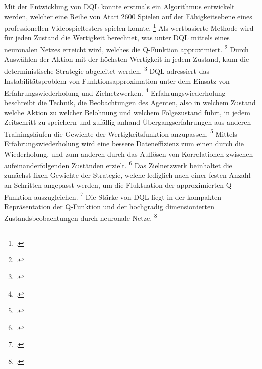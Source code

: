 Mit der Entwicklung von DQL konnte erstmals ein Algorithmus entwickelt werden, welcher eine Reihe von Atari 2600 Spielen auf der Fähigkeitsebene eines professionellen Videospieltesters spielen konnte. \footcite[Vgl.][S. 6]{Arulkumaran.2017}
Als wertbasierte Methode wird für jeden Zustand die Wertigkeit berechnet, was unter DQL mittels eines neuronalen Netzes erreicht wird, welches die Q-Funktion approximiert. \footcite[Vgl.][S. 4]{Huang.2017}
Durch Auswählen der Aktion mit der höchsten Wertigkeit in jedem Zustand, kann die deterministische Strategie abgeleitet werden. \footcite[Vgl.][S. 4]{Huang.2017}
DQL adressiert das Instabilitätsproblem von Funktionsapproximation unter dem Einsatz von Erfahrungswiederholung und Zielnetzwerken. \footcite[Vgl.][S. 7]{Arulkumaran.2017}
Erfahrungswiederholung beschreibt die Technik, die Beobachtungen des Agenten, also in welchem Zustand welche Aktion zu welcher Belohnung und welchem Folgezustand führt, in jedem Zeitschritt zu speichern und zufällig anhand Übergangserfahrungen aus anderen Trainingsläufen die Gewichte der Wertigkeitsfunktion anzupassen. \footcite[Vgl.][S. 4]{Mnih.2013}
Mittels Erfahrungswiederholung wird eine bessere Dateneffizienz zum einen durch die Wiederholung, und zum anderen durch das Auflösen von Korrelationen zwischen aufeinanderfolgenden Zuständen erzielt. \footcite[Vgl.][S. 4f.]{Mnih.2013}
Das Zielnetzwerk beinhaltet die zunächst fixen Gewichte der Strategie, welche lediglich nach einer festen Anzahl an Schritten angepasst werden, um die Fluktuation der approximierten Q-Funktion auszugleichen. \footcite[Vgl.][S. 7]{Arulkumaran.2017}
Die Stärke von DQL liegt in der kompakten Repräsentation der Q-Funktion und der hochgradig dimensionierten Zustandsbeobachtungen durch neuronale Netze. \footcite[Vgl.][S. 7]{Arulkumaran.2017}

